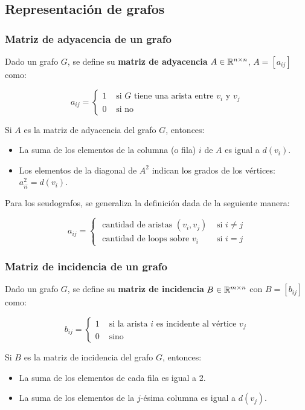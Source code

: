 \subsection{Representación de grafos}
\subsubsection{Matriz de adyacencia de un grafo}
Dado un grafo \(G\), se define su \textbf{matriz de adyacencia} \(A\in\mathbb{R}^{n\times n}\), \(A = [a_{ij}]\) como:

\[a_{ij} = \begin{cases} 
1 & \text{ si } G \text{ tiene una arista entre } v_i \text{ y } v_j\\
0 & \text{ si no }
\end{cases}
\]

\begin{proposicion}
	Si \(A\) es la matriz de adyacencia del grafo \(G\), entonces:
	\begin{itemize}
		\item La suma de los elementos de la columna (o fila) \(i\) de \(A\) es igual a \(d(v_i)\).
		\item Los elementos de la diagonal de \(A^2\) indican los grados de los vértices: \(a_{ii}^2 = d(v_i)\).
	\end{itemize}
\end{proposicion}

Para los seudografos, se generaliza la definición dada de la seguiente manera:

\[a_{ij} = \begin{cases} 
\text{ cantidad de aristas }(v_i,v_j)& \text{ si } i \neq j\\
\text{ cantidad de loops sobre } v_i & \text{ si } i = j
\end{cases}
\]

\subsubsection{Matriz de incidencia de un grafo}
Dado un grafo \(G\), se define su \textbf{matriz de incidencia} \(B\in\mathbb{R}^{m\times n}\) con \(B = [b_{ij}]\) como:

\[b_{ij} = \begin{cases}
1 & \text{ si la arista } i \text{ es incidente al vértice } v_j \\
0 & \text{ sino }
\end{cases}\]

\begin{proposicion}
	Si \(B\) es la matriz de incidencia del grafo \(G\), entonces:
	\begin{itemize}
		\item La suma de los elementos de cada fila es igual a 2.
		\item La suma de los elementos de la \(j\)-ésima columna es igual a \(d(v_j)\).
	\end{itemize}
\end{proposicion}

